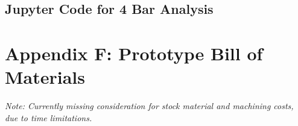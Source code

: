 \documentclass{article}
\begin{document}
\newpage 

\subsection{Jupyter Code for 4 Bar Analysis}


\section{Appendix F: Prototype Bill of Materials}

\textit{Note: Currently missing consideration for stock material and machining costs, due to time limitations.}


\end{document}

